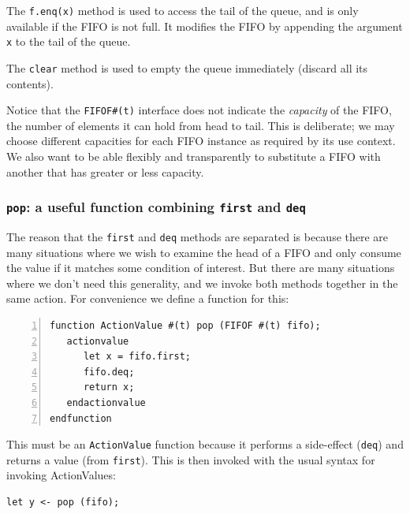 The \verb|f.enq(x)| method is used to access the tail of the queue,
and is only available if the FIFO is not full.  It modifies the FIFO
by appending the argument \verb|x| to the tail of the queue.

The \verb|clear| method is used to empty the queue immediately
(discard all its contents).

Notice that the {\tt FIFOF\#(t)} interface does not indicate the
\emph{capacity} of the FIFO, {\ie} the number of elements it can hold
from head to tail.  This is deliberate; we may choose different
capacities for each FIFO instance as required by its use context.  We
also want to be able flexibly and transparently to substitute a FIFO
with another that has greater or less capacity.


\subsubsection{{\tt pop}: a useful function combining {\tt first} and {\tt deq}}

\label{Sec_FIFOF_pop}


The reason that the \verb|first| and \verb|deq| methods are separated
is because there are many situations where we wish to examine the head
of a FIFO and only consume the value if it matches some condition of
interest.  But there are many situations where we don't need this
generality, and we invoke both methods together in the same action.
For convenience we define a function for this:

{\footnotesize
\begin{Verbatim}[frame=single, numbers=left]
function ActionValue #(t) pop (FIFOF #(t) fifo);
   actionvalue
      let x = fifo.first;
      fifo.deq;
      return x;
   endactionvalue
endfunction
\end{Verbatim}
}

This must be an {\tt ActionValue} function because it performs a
side-effect ({\tt deq}) and returns a value (from {\tt first}).  This
is then invoked with the usual syntax for invoking ActionValues:

{\footnotesize
\begin{Verbatim}[frame=single]
   let y <- pop (fifo);
\end{Verbatim}
}


